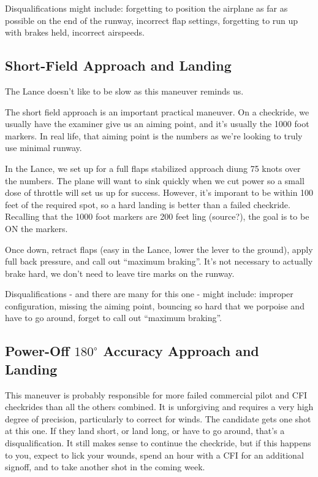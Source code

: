 Disqualifications might include: forgetting to position the airplane as far as possible on the end of the runway, incorrect flap settings, forgetting to run up with brakes held, incorrect airspeeds.

\subsection{Short-Field Approach and Landing}

The Lance doesn't like to be slow as this maneuver reminds us.

The short field approach is an important practical maneuver. On a checkride, we usually have the examiner give us an aiming point, and it's usually the 1000 foot markers. In real life, that aiming point is the numbers as we're looking to truly use minimal runway.

In the Lance, we set up for a full flaps stabilized approach diung 75 knots over the numbers. The plane will want to sink quickly when we cut power so a small dose of throttle will set us up for success. However, it's imporant to be within 100 feet of the required spot, so a hard landing is better than a failed checkride. Recalling that the 1000 foot markers are 200 feet ling (source?), the goal is to be ON the markers.

Once down, retract flaps (easy in the Lance, lower the lever to the ground), apply full back pressure, and call out ``maximum braking''. It's not necessary to actually brake hard, we don't need to leave tire marks on the runway.

Disqualifications - and there are many for this one - might include: improper configuration, missing the aiming point, bouncing so hard that we porpoise and have to go around, forget to call out ``maximum braking''.

\subsection{Power-Off $180^\circ$ Accuracy Approach and Landing}

This maneuver is probably responsible for more failed commercial pilot and CFI checkrides than all the others combined. It is unforgiving and requires a very high degree of precision, particularly to correct for winds. The candidate gets one shot at this one. If they land short, or land long, or have to go around, that's a disqualification. It still makes sense to continue the checkride, but if this happens to you, expect to lick your wounds, spend an hour with a CFI for an additional signoff, and to take another shot in the coming week.

